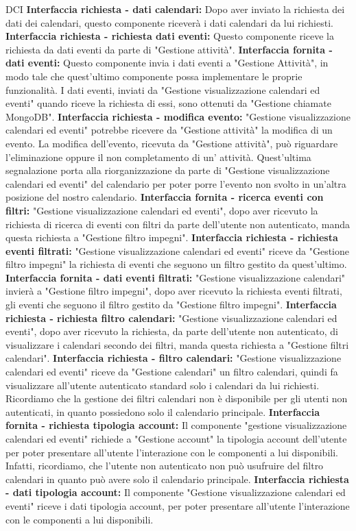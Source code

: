 \begin{listaPersonale}{DCI}
    \textbf{Interfaccia richiesta - dati calendari:} Dopo aver inviato la richiesta dei dati dei calendari, questo componente riceverà i dati calendari da lui richiesti.
    \textbf{Interfaccia richiesta - richiesta dati eventi:} Questo componente riceve la richiesta da dati eventi da parte di "Gestione attività".
    \textbf{Interfaccia fornita - dati eventi:} Questo componente invia i dati eventi a "Gestione Attività", in modo tale che quest'ultimo componente possa implementare le proprie funzionalità. I dati eventi, inviati da "Gestione visualizzazione calendari ed eventi" quando riceve la richiesta di essi, sono ottenuti da "Gestione chiamate MongoDB".
    \textbf{Interfaccia richiesta - modifica evento:} "Gestione visualizzazione calendari ed eventi" potrebbe ricevere da "Gestione attività" la modifica di un evento. La modifica dell'evento, ricevuta da "Gestione attività", può riguardare l'eliminazione oppure il non completamento di un' attività. Quest'ultima segnalazione porta alla riorganizzazione da parte di "Gestione visualizzazione calendari ed eventi" del calendario per poter porre l'evento non svolto in un'altra posizione del nostro calendario.
    \textbf{Interfaccia fornita - ricerca eventi con filtri:} "Gestione visualizzazione calendari ed eventi", dopo aver ricevuto la richiesta di ricerca di eventi con filtri da parte dell'utente non autenticato, manda questa richiesta a "Gestione filtro impegni".
    \textbf{Interfaccia richiesta - richiesta eventi filtrati:} "Gestione visualizzazione calendari ed eventi" riceve da "Gestione filtro impegni" la richiesta di eventi che seguono un filtro gestito da quest'ultimo.
    \textbf{Interfaccia fornita - dati eventi filtrati:} "Gestione visualizzazione calendari" invierà  a "Gestione filtro impegni", dopo aver ricevuto la richiesta eventi filtrati, gli eventi che seguono il filtro gestito da "Gestione filtro impegni".
    \textbf{Interfaccia richiesta - richiesta filtro calendari:} "Gestione visualizzazione calendari ed eventi", dopo aver ricevuto la richiesta, da parte dell'utente non autenticato, di visualizzare i calendari secondo dei filtri, manda questa richiesta a "Gestione filtri calendari".
    \textbf{Interfaccia richiesta - filtro calendari:} "Gestione visualizzazione calendari ed eventi" riceve da "Gestione calendari" un filtro calendari, quindi fa visualizzare all'utente autenticato standard solo i calendari da lui richiesti. Ricordiamo che la gestione dei filtri calendari non è disponibile per gli utenti non autenticati, in quanto possiedono solo il calendario principale.
    \textbf{Interfaccia fornita - richiesta tipologia account:} Il componente "gestione visualizzazione calendari ed eventi" richiede a "Gestione account"  la tipologia account dell'utente per poter presentare all'utente l'interazione con le componenti a lui disponibili. Infatti, ricordiamo, che l'utente non autenticato non può usufruire del filtro calendari in quanto può avere solo il calendario principale.
    \textbf{Interfaccia richiesta - dati tipologia account:} Il componente "Gestione visualizzazione calendari ed eventi" riceve i dati tipologia account, per poter presentare all'utente l'interazione con le componenti a lui disponibili.



\end{listaPersonale}
